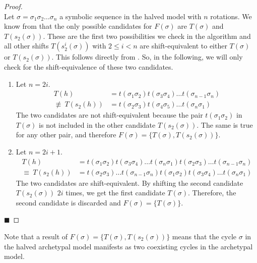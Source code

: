 \begin{proof} \phantom{x} \\
	Let $\sigma = \sigma_1\sigma_2 \dots \sigma_n$ a symbolic sequence in the halved model with $n$ rotations.
	We know from  that the only possible candidates for $F(\sigma)$ are $T(\sigma)$ and $T(s_2(\sigma))$.
	These are the first two possibilities we check in the algorithm and all other shifts $T(s_2^i(\sigma))$ with $2 \leq i < n$ are shift-equivalent to either $T(\sigma)$ or $T(s_2(\sigma))$.
	This follows directly from .
	So, in the following, we will only check for the shift-equivalence of these two candidates.
	\begin{enumerate}
		\item Let $n = 2i$.
		      \begin{align*}
			      T(h)                 & = t(\sigma_1\sigma_2) t(\sigma_3\sigma_4) \dots t(\sigma_{n-1}\sigma_n) \\
			      \nequiv \: T(s_2(h)) & = t(\sigma_2\sigma_3) t(\sigma_4\sigma_5) \dots t(\sigma_n\sigma_1)
		      \end{align*}
		      The two candidates are not shift-equivalent because the pair $t(\sigma_1\sigma_2)$ in $T(\sigma)$ is not included in the other candidate $T(s_2(\sigma))$.
		      The same is true for any other pair, and therefore $F(\sigma) = \{T(\sigma), T(s_2(\sigma))\}$.
		\item Let $n = 2i + 1$.
		      \begin{align*}
			      T(h)                & = t(\sigma_1\sigma_2) t(\sigma_3\sigma_4) \dots t(\sigma_n\sigma_1) t(\sigma_2\sigma_3) \dots t(\sigma_{n-1}\sigma_n) \\
			      \equiv \: T(s_2(h)) & = t(\sigma_2\sigma_3) \dots t(\sigma_{n-1}\sigma_n) t(\sigma_1\sigma_2) t(\sigma_3\sigma_4) \dots t(\sigma_n\sigma_1)
		      \end{align*}
		      The two candidates are shift-equivalent.
		      By shifting the second candidate $T(s_2(\sigma))$ $2i$ times, we get the first candidate $T(\sigma)$.
		      Therefore, the second candidate is discarded and $F(\sigma) = \{T(\sigma)\}$.
	\end{enumerate}
	\hfill $\blacksquare$
\end{proof}

Note that a result of $F(\sigma) = \{T(\sigma), T(s_2(\sigma))\}$ means that the cycle $\sigma$ in the halved archetypal model manifests as two coexisting cycles in the archetypal model.


